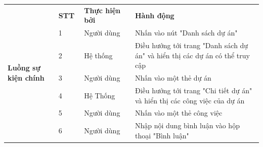 \documentclass[../DoAn.tex]{subfiles}
\begin{document}
\begin{table}[ht]
\begin{tabular}{| p{0.2\linewidth} | p{0.1\linewidth} | p{0.2\linewidth} | p{0.5\linewidth} |}
        \multirow{12}{\linewidth}{\textbf{Luồng sự kiện chính}}      & \multicolumn{1}{p{0.1\linewidth}|}{\textbf{STT}}                                                  & \multicolumn{1}{p{0.2\linewidth}|}{\textbf{Thực hiện bởi}} & \multicolumn{1}{p{0.5\linewidth}|}{\textbf{Hành động}}                                                                         \\ \cline{2-4}
                                                                     & \multicolumn{1}{p{0.1\linewidth}|}{1}                                                             & \multicolumn{1}{p{0.2\linewidth}|}{Người dùng}             & \multicolumn{1}{p{0.5\linewidth}|}{Nhấn vào nút "Danh sách dự án"}                                                             \\ \cline{2-4}
                                                                     & \multicolumn{1}{p{0.1\linewidth}|}{2}                                                             & \multicolumn{1}{p{0.2\linewidth}|}{Hệ thống}               & \multicolumn{1}{p{0.5\linewidth}|}{Điều hướng tới trang "Danh sách dự án" và hiển thị các dự án có thể truy cập}               \\ \cline{2-4}
                                                                     & \multicolumn{1}{p{0.1\linewidth}|}{3}                                                             & \multicolumn{1}{p{0.2\linewidth}|}{Người dùng}             & \multicolumn{1}{p{0.5\linewidth}|}{Nhấn vào một thẻ dự án}                                                                     \\ \cline{2-4}
                                                                     & \multicolumn{1}{p{0.1\linewidth}|}{4}                                                             & \multicolumn{1}{p{0.2\linewidth}|}{Hệ Thống}               & \multicolumn{1}{p{0.5\linewidth}|}{Điều hướng tới trang "Chi tiết dự án" và hiển thị các công việc của dự án}                  \\ \cline{2-4}
                                                                     & \multicolumn{1}{p{0.1\linewidth}|}{5}                                                             & \multicolumn{1}{p{0.2\linewidth}|}{Người dùng}             & \multicolumn{1}{p{0.5\linewidth}|}{Nhấn vào một thẻ công việc}                                                                 \\ \cline{2-4}
                                                                     & \multicolumn{1}{p{0.1\linewidth}|}{6}                                                             & \multicolumn{1}{p{0.2\linewidth}|}{Người dùng}             & \multicolumn{1}{p{0.5\linewidth}|}{Nhập nội dung bình luận vào hộp thoại "Bình luận"}                                          \\ \cline{2-4}

\end{tabular}
\end{table}
\end{document}
